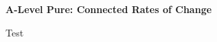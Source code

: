 \documentclass[12pt]{article}
\newcommand{\sheetname}
{A-Level Pure: Connected Rates of Change}
\begin{document}
\begin{center}
    \Large \textbf{\sheetname}
\end{center}



\newpage

Test
\end{document}
